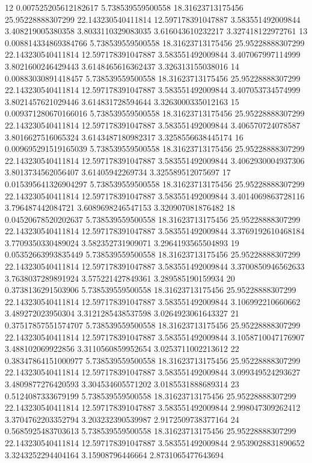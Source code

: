 {12 0.007525205612182617 5.738539559500558 18.31623713175456 25.95228888307299 22.143230540411814 12.597178391047887 3.583551492009844 3.408219005380358 3.8033110329083035 3.616043610232217 3.327418122972761
13 0.008814334869384766 5.738539559500558 18.31623713175456 25.95228888307299 22.143230540411814 12.597178391047887 3.583551492009844 3.407067997114999 3.8021600246429443 3.6148465616362437 3.326313155038016
14 0.00883030891418457 5.738539559500558 18.31623713175456 25.95228888307299 22.143230540411814 12.597178391047887 3.583551492009844 3.407053734574999 3.8021457621029446 3.614831728594644 3.3263000335012163
15 0.009371280670166016 5.738539559500558 18.31623713175456 25.95228888307299 22.143230540411814 12.597178391047887 3.583551492009844 3.406570724078587 3.8016627516065324 3.6143487180982317 3.3258556638445174
16 0.009695291519165039 5.738539559500558 18.31623713175456 25.95228888307299 22.143230540411814 12.597178391047887 3.583551492009844 3.4062930004937306 3.8013734562056407 3.61405942269734 3.325589512075697
17 0.015395641326904297 5.738539559500558 18.31623713175456 25.95228888307299 22.143230540411814 12.597178391047887 3.583551492009844 3.4014069863728116 3.796487442084721 3.6089698246547153 3.320907081876482
18 0.04520678520202637 5.738539559500558 18.31623713175456 25.95228888307299 22.143230540411814 12.597178391047887 3.583551492009844 3.3769192610468184 3.7709350330489024 3.582352731909071 3.2964193565504893
19 0.05352663993835449 5.738539559500558 18.31623713175456 25.95228888307299 22.143230540411814 12.597178391047887 3.583551492009844 3.3700850946562633 3.7638037289891924 3.575221427849361 3.289585190159934
20 0.3738136291503906 5.738539559500558 18.31623713175456 25.95228888307299 22.143230540411814 12.597178391047887 3.583551492009844 3.106992210660662 3.489272023950304 3.3121285438537598 3.0264923061643327
21 0.37517857551574707 5.738539559500558 18.31623713175456 25.95228888307299 22.143230540411814 12.597178391047887 3.583551492009844 3.1058710047176907 3.488102069922856 3.3110560859952654 3.0253711002213612
22 0.38347864151000977 5.738539559500558 18.31623713175456 25.95228888307299 22.143230540411814 12.597178391047887 3.583551492009844 3.099349524293627 3.4809877276420593 3.304534605571202 3.0185531888689314
23 0.5124087333679199 5.738539559500558 18.31623713175456 25.95228888307299 22.143230540411814 12.597178391047887 3.583551492009844 2.998047309262412 3.3704762203352794 3.203232390539987 2.9172509738377164
24 0.5685925483703613 5.738539559500558 18.31623713175456 25.95228888307299 22.143230540411814 12.597178391047887 3.583551492009844 2.9539028831890652 3.3243252294404164 3.15908796446664 2.8731065477643694
}
